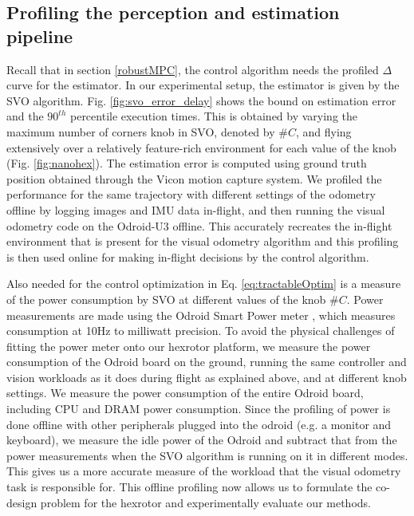 

\subsection{Profiling the perception and estimation pipeline}

Recall that in section \ref{robustMPC}, the control algorithm needs the profiled $\Delta$ curve for the estimator. 
In our experimental setup, the estimator is given by the SVO algorithm. 
Fig. \ref{fig:svo_error_delay} shows the bound on estimation error and the $90^{th}$ percentile execution times.
This is obtained by varying the maximum number of corners knob in SVO, denoted by $\#C$, and flying extensively over a relatively feature-rich environment for each value of the knob (Fig. \ref{fig:nanohex}). 
The estimation error is computed using ground truth position obtained through the Vicon motion capture system. 
We profiled the performance for the same trajectory with different settings of the odometry offline by logging images and IMU data in-flight, and then running the visual odometry code on the Odroid-U3 offline.
This accurately recreates the in-flight environment that is present for the visual odometry algorithm and this profiling is then used online for making in-flight decisions by the control algorithm.

Also needed for the control optimization in Eq. \ref{eq:tractableOptim} is a measure of the power consumption by SVO at different values of the knob $\#C$. 
Power measurements are made using the Odroid Smart Power meter \cite{OdroidSmartPower}, which measures consumption at 10Hz to milliwatt precision. 
To avoid the physical challenges of fitting the power meter onto our hexrotor platform, we measure the power consumption of the Odroid board on the ground, running the same controller and vision workloads as it does during flight as explained above, and at different knob settings.
We measure the power consumption of the entire Odroid board, including CPU and DRAM power consumption. 
Since the profiling of power is done offline with other peripherals plugged into the odroid (e.g. a monitor and keyboard), we measure the idle power of the Odroid and subtract that from the power measurements when the SVO algorithm is running on it in different modes. 
This gives us a more accurate measure of the workload that the visual odometry task is responsible for. 
This offline profiling now allows us to formulate the co-design problem for the hexrotor and experimentally evaluate our methods.


